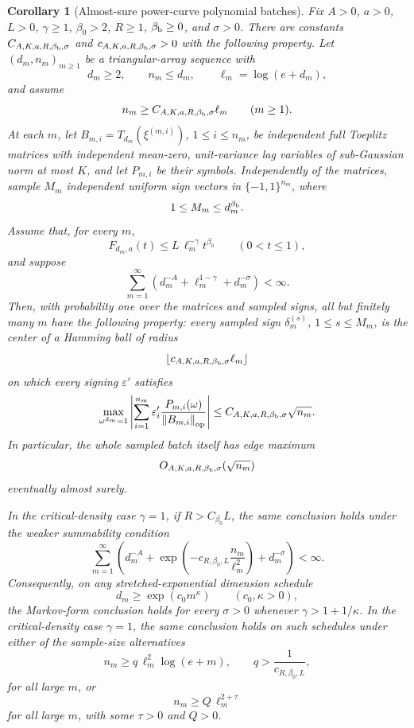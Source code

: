 \documentclass[11pt]{amsart}
\numberwithin{equation}{section}
\newtheorem{corollary}[theorem]{Corollary}
\theoremstyle{definition}
\theoremstyle{remark}
\newcommand{\op}{\mathrm{op}}
\newcommand{\norm}[1]{\left\lVert #1\right\rVert}
\newcommand{\eps}{\varepsilon}
\begin{document}
\begin{corollary}[Almost-sure power-curve polynomial batches]
\label{cor:normalizer-tail-power-borel-poly-batch}
Fix \(A>0\), \(a>0\), \(L>0\), \(\gamma\ge1\), \(\beta_0>2\), \(R\ge1\),
\(\beta_{\rm b}\ge0\), and \(\sigma>0\).  There are constants
\(C_{A,K,a,R,\beta_{\rm b},\sigma}\) and
\(c_{A,K,a,R,\beta_{\rm b},\sigma}>0\) with the following property.  Let
\((d_m,n_m)_{m\ge1}\) be a triangular-array sequence with
\[
  d_m\ge2,\qquad n_m\le d_m,\qquad \ell_m=\log(e+d_m),
\]
and assume
\[
  n_m\ge C_{A,K,a,R,\beta_{\rm b},\sigma}\ell_m \qquad(m\ge1).
\]
At each \(m\), let \(B_{m,i}=T_{d_m}(\xi^{(m,i)})\), \(1\le i\le n_m\), be
independent full Toeplitz matrices with independent mean-zero, unit-variance lag
variables of sub-Gaussian norm at most \(K\), and let \(P_{m,i}\) be their
symbols.  Independently of the matrices, sample \(M_m\) independent uniform sign
vectors in \(\{-1,1\}^{n_m}\), where
\[
  1\le M_m\le d_m^{\beta_{\rm b}} .
\]
Assume that, for every \(m\),
\[
  F_{d_m,a}(t)\le L\,\ell_m^{-\gamma}t^{\beta_0}
  \qquad(0<t\le1),
\]
and suppose
\[
  \sum_{m=1}^{\infty}
  \left(d_m^{-A}+\ell_m^{1-\gamma}+d_m^{-\sigma}\right)<\infty .
\]
Then, with probability one over the matrices and sampled signs, all but
finitely many \(m\) have the following property: every sampled sign
\(\delta_m^{(s)}\), \(1\le s\le M_m\), is the center of a Hamming ball of radius
\[
  \left\lfloor c_{A,K,a,R,\beta_{\rm b},\sigma}\ell_m\right\rfloor
\]
on which every signing \(\eps'\) satisfies
\[
  \max_{\omega^{d_m}=1}\left|\sum_{i=1}^{n_m}
  \eps'_i\frac{P_{m,i}(\omega)}{\norm{B_{m,i}}_{\op}}\right|
  \le C_{A,K,a,R,\beta_{\rm b},\sigma}\sqrt{n_m}.
\]
In particular, the whole sampled batch itself has edge maximum
\[
  O_{A,K,a,R,\beta_{\rm b},\sigma}(\sqrt{n_m})
\]
eventually almost surely.

In the critical-density case \(\gamma=1\), if \(R>C_{\beta_0}L\), the same
conclusion holds under the weaker summability condition
\[
  \sum_{m=1}^{\infty}
  \left(d_m^{-A}
  +\exp\left(-c_{R,\beta_0,L}\frac{n_m}{\ell_m^2}\right)
  +d_m^{-\sigma}\right)<\infty .
\]
Consequently, on any stretched-exponential dimension schedule
\[
  d_m\ge\exp(c_0m^\kappa)
  \qquad(c_0,\kappa>0),
\]
the Markov-form conclusion holds for every \(\sigma>0\) whenever
\(\gamma>1+1/\kappa\).  In the critical-density case \(\gamma=1\), the same
conclusion holds on such schedules under either of the sample-size alternatives
\[
  n_m\ge q\,\ell_m^2\log(e+m),\qquad q>\frac1{c_{R,\beta_0,L}},
\]
for all large \(m\), or
\[
  n_m\ge Q\,\ell_m^{2+\tau}
\]
for all large \(m\), with some \(\tau>0\) and \(Q>0\).
\end{corollary}
\end{document}
